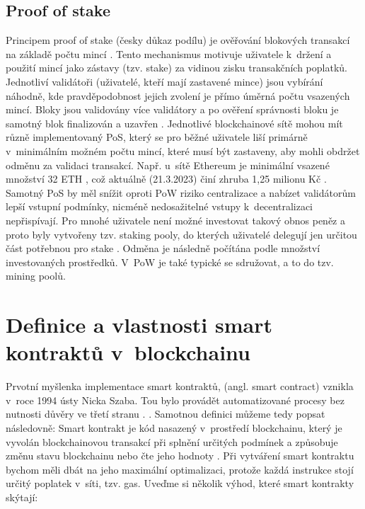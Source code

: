 \subsection*{Proof of stake}
Principem proof of stake (česky důkaz podílu) je ověřování blokových transakcí na základě počtu  mincí \cite{POS}. Tento mechanismus motivuje uživatele k~držení a použití mincí jako zástavy (tzv. stake) za vidinou zisku transakčních poplatků. Jednotliví validátoři (uživatelé, kteří mají zastavené mince) jsou vybírání náhodně, kde pravděpodobnost jejich zvolení je přímo úměrná počtu vsazených mincí. Bloky jsou validovány více validátory a po ověření správnosti bloku je samotný blok finalizován a uzavřen \cite{POW_POS}. Jednotlivé blockchainové sítě mohou mít různě implementovaný PoS, který se pro běžné uživatele liší primárně v~minimálním možném počtu mincí, které musí být zastaveny, aby mohli obdržet odměnu za validaci transakcí. Např. u~sítě Ethereum je minimální vsazené množství 32 ETH \cite{ETH}, což aktuálně (21.3.2023) činí zhruba 1,25 milionu Kč \cite{coinmarketcap}. Samotný PoS by měl snížit oproti PoW riziko centralizace a nabízet validátorům lepší vstupní podmínky, nicméně nedosažitelné vstupy k~decentralizaci nepřispívají. Pro mnohé uživatele není možné investovat takový obnos peněz a proto byly vytvořeny tzv. staking pooly, do kterých uživatelé delegují jen určitou část potřebnou pro stake \cite{ethereum}. Odměna je následně počítána podle množství investovaných prostředků. V~PoW je také typické se sdružovat, a to do tzv. mining poolů.
\section{Definice a vlastnosti smart kontraktů v~blockchainu}
\label{section:sc}
Prvotní myšlenka implementace smart kontraktů, (angl. smart contract) vznikla v~roce 1994 ústy Nicka Szaba. Tou bylo provádět automatizované procesy bez nutnosti důvěry ve třetí stranu \cite{eth_sc}.  \cite{Voshmgir2017}. Samotnou definici můžeme tedy popsat následovně: Smart kontrakt je kód nasazený v~prostředí blockchainu, který je vyvolán blockchainovou transakcí při splnění určitých podmínek a způsobuje změnu stavu blockchainu nebo čte jeho hodnoty \cite{SC}. Při vytváření smart kontraktu bychom měli dbát na jeho maximální optimalizaci, protože každá instrukce stojí určitý poplatek v~síti, tzv. gas. Uveďme si několik výhod, které smart kontrakty skýtají:

